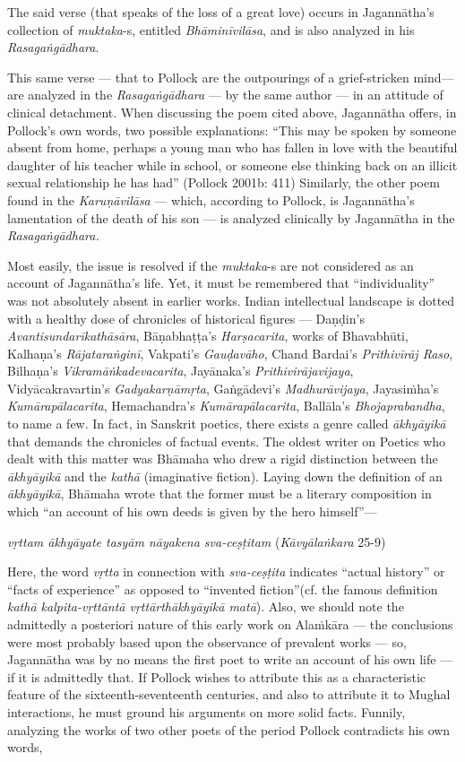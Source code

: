 The said verse (that speaks of the loss of a great love) occurs in Jagannātha’s collection of {\sl muktaka}-s, entitled {\sl Bhāminīvilāsa}, and is also analyzed in his {\sl Rasagaṅgādhara}. 

This same verse — that to Pollock are the outpourings of a grief-stricken mind— are analyzed in the {\sl Rasagaṅgādhara} — by the same author — in an attitude of clinical detachment. When discussing the poem cited above, Jagannātha offers, in Pollock’s own words, two possible explanations: “This may be spoken by someone absent from home, perhaps a young man who has fallen in love with the beautiful daughter of his teacher while in school, or someone else thinking back on an illicit sexual relationship he has had” (Pollock 2001b: 411) Similarly, the other poem found in the {\sl Karuṇāvilāsa} — which, according to Pollock, is Jagannātha’s lamentation of the death of his son — is analyzed clinically by Jagannātha in the {\sl Rasagaṅgādhara.}
\begin{myquote}
Most easily, the issue is resolved if the {\sl muktaka}-s are not considered as an account of Jagannātha’s life. Yet, it must be remembered that “individuality” was not absolutely absent in earlier works. Indian intellectual landscape is dotted with a healthy dose of chronicles of historical figures — Daṇḍin’s {\sl Avantisundarīkathāsāra}, Bāṇabhaṭṭa’s {\sl Harṣacarita}, works of Bhavabhūti, Kalhaṇa’s {\sl Rājataraṅginī}, Vakpati’s {\sl Gauḍavāho}, Chand Bardai’s {\sl Prithivīrāj Raso}, Bilhaṇa’s {\sl Vikramāṅkadevacarita}, Jayānaka’s {\sl Prithivirājavijaya}, Vidyācakravartin’s {\sl Gadyakarṇāmṛta}, Gaṅgādevi’s {\sl Madhurāvijaya}, Jayasiṁha’s {\sl Kumārapālacarita}, Hemachandra’s {\sl Kumārapālacarita}, Ballāla’s {\sl Bhojaprabandha},  to name a few. In fact, in Sanskrit poetics, there exists a genre called {\sl ākhyāyikā} that demands the chronicles of factual events. The oldest writer on Poetics who dealt with this matter was Bhāmaha who drew a rigid distinction between the {\sl ākhyāyikā} and the {\sl kathā} (imaginative fiction). Laying down the definition of an {\sl ākhyāyikā}, Bhāmaha wrote that the former must be a literary composition in which “an account of his own deeds is given by the hero himself”— 

{\sl vṛttam ākhyāyate tasyām nāyakena sva-ceṣṭitam} 	          \hfill{({\sl Kāvyālaṅkara} 25-9)}
\end{myquote}


Here, the word {\sl vṛtta} in connection with {\sl sva-ceṣṭita} indicates “actual history” or “facts of experience” as opposed to “invented fiction”(cf. the famous definition {\sl kathā kalpita-vṛttāntā vṛttārthākhyāyikā matā}). Also, we should note the admittedly a posteriori nature of this early work on Alaṁkāra — the conclusions were most probably based upon the observance of prevalent works — so, Jagannātha was by no means the first poet to write an account of his own life — if it is admittedly that.  If Pollock wishes to attribute this as a characteristic feature of the sixteenth-seventeenth centuries, and also to attribute it to Mughal interactions, he must ground his arguments on more solid facts. Funnily, analyzing the works of two other poets of the period Pollock contradicts his own words,

